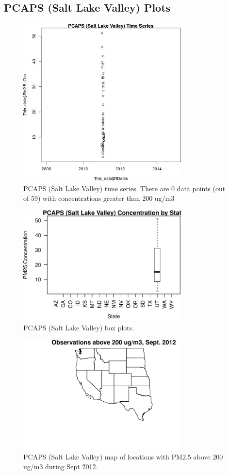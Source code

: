 \subsection{PCAPS (Salt Lake Valley) Plots}
\begin{figure} 
\centering 
\includegraphics[width=0.77\textwidth]{Code_Outputs/PCAPS_time_series.jpg} 
\caption{\label{fig:PCAPSTS}PCAPS (Salt Lake Valley) time series. There are 0 data points (out of 59) with concentrations greater than 200 ug/m3} 
\end{figure} 
 

\begin{figure} 
\centering 
\includegraphics[width=0.77\textwidth]{Code_Outputs/PCAPS_state_boxplots.pdf} 
\caption{\label{fig:PCAPSBP}PCAPS (Salt Lake Valley) box plots.} 
\end{figure} 
 

\begin{figure} 
\centering 
\includegraphics[width=0.77\textwidth]{Code_Outputs/PCAPSSep2012High_map.pdf} 
\caption{\label{fig:PCAPSS12}PCAPS (Salt Lake Valley) map of locations with PM2.5 above 200 ug/m3 during Sept 2012.} 
\end{figure} 
 
